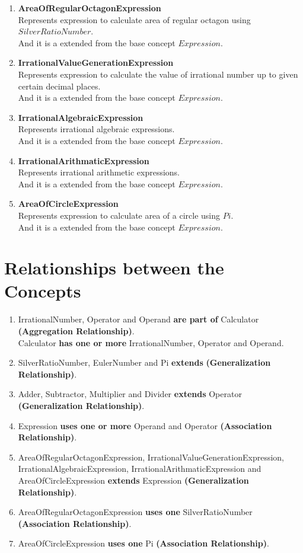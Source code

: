 \begin{enumerate}
  \item \textbf{AreaOfRegularOctagonExpression} \\ Represents expression to calculate area of regular octagon using $SilverRatioNumber$. \\ And it is a extended from the base concept $Expression$.
  \item \textbf{IrrationalValueGenerationExpression} \\ Represents expression to calculate the value of irrational number up to given certain decimal places. \\ And it is a extended from the base concept $Expression$.
  \item \textbf{IrrationalAlgebraicExpression} \\ Represents irrational algebraic expressions. \\ And it is a extended from the base concept $Expression$.
  \item \textbf{IrrationalArithmaticExpression} \\ Represents irrational arithmetic expressions. \\ And it is a extended from the base concept $Expression$.
  \item \textbf{AreaOfCircleExpression} \\ Represents expression to calculate area of a circle using $Pi$. \\ And it is a extended from the base concept $Expression$.
\end{enumerate} 

\section{Relationships between the Concepts}
\begin{enumerate}
\item IrrationalNumber, Operator and Operand \textbf{are part of} Calculator \textbf{(Aggregation Relationship)}.
\\ Calculator \textbf{has one or more} IrrationalNumber, Operator and Operand.
\item SilverRatioNumber, EulerNumber and Pi \textbf{extends} \textbf{(Generalization Relationship)}.
\item Adder, Subtractor, Multiplier and Divider \textbf{extends} Operator \textbf{(Generalization Relationship)}.
\item Expression \textbf{uses one or more} Operand and Operator \textbf{(Association Relationship)}.
\item AreaOfRegularOctagonExpression, IrrationalValueGenerationExpression, IrrationalAlgebraicExpression, IrrationalArithmaticExpression and AreaOfCircleExpression \textbf{extends} Expression \textbf{(Generalization Relationship)}.
\item AreaOfRegularOctagonExpression \textbf{uses one} SilverRatioNumber \textbf{(Association Relationship)}.
\item AreaOfCircleExpression \textbf{uses one} Pi \textbf{(Association Relationship)}.
\end{enumerate} 
